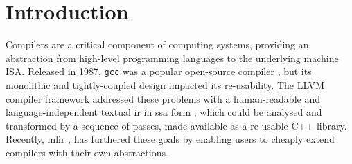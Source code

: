 \chapter{Introduction}
\label{chap:introduction}




Compilers are a critical component of computing systems, providing an abstraction from high-level programming languages to the underlying machine ISA.
Released in 1987, \texttt{gcc} was a popular open-source compiler \cite{stallmanUsingGnuCompiler2009}, but its monolithic and tightly-coupled design impacted its re-usability.
The LLVM compiler framework \cite{lattnerLLVMCompilationFramework2004} addressed these problems with a human-readable and language-independent textual \ac{ir} in \ac{ssa} form \cite{cytronEfficientlyComputingStatic1991}, which could be analysed and transformed by a sequence of passes, made available as a re-usable C++ library.
Recently, \ac{mlir} \cite{lattnerMLIRScalingCompiler2021a}, has furthered these goals by enabling users to cheaply extend compilers with their own abstractions.





